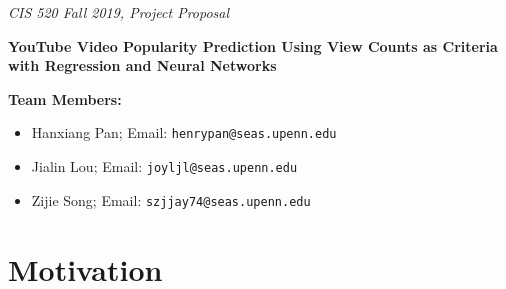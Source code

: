 \documentclass[english]{article}
\begin{document}
\emph{\footnotesize{CIS 520 Fall 2019, Project Proposal}}


\vspace{12pt}



\textbf{\Large{YouTube Video Popularity Prediction Using View Counts as Criteria with Regression and Neural Networks}}

\vspace{1cm}

\textbf{Team Members:}

\begin{itemize}
 \item Hanxiang Pan; Email: \texttt{henrypan@seas.upenn.edu}
 \item Jialin Lou; Email: \texttt{joyljl@seas.upenn.edu}
 \item Zijie Song; Email: \texttt{szjjay74@seas.upenn.edu} 
\end{itemize}

\hline




\section{Motivation}
\end{document}
